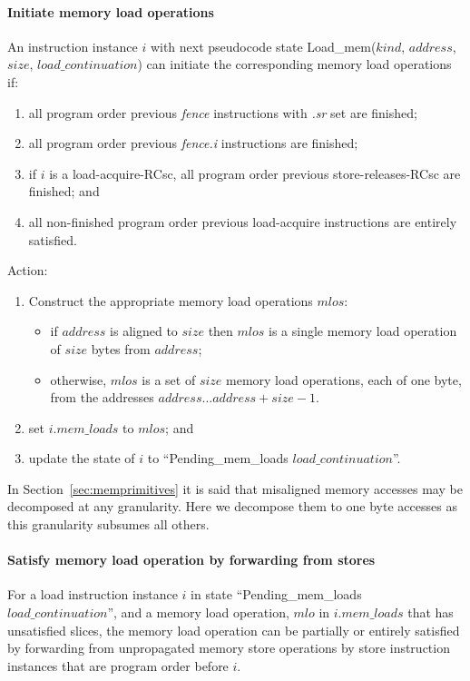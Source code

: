\paragraph{Initiate memory load operations}\label{omm:initiate_load}
An instruction instance $i$ with next pseudocode state {\sc Load\_mem}($kind$, $address$, $size$, $load\_continuation$) can initiate the corresponding memory load operations if:
\begin{enumerate}
\item all program order previous {\em fence} instructions with {\em .sr} set are finished;
\item all program order previous {\em fence.i} instructions are finished; 
\item if $i$ is a load-acquire-RCsc, all program order previous store-releases-RCsc are finished; and
\item all non-finished program order previous load-acquire instructions are entirely satisfied.
\end{enumerate}
Action:
\begin{enumerate}
\item Construct the appropriate memory load operations $mlos$:
  \begin{itemize}
  \item if $address$ is aligned to $size$ then $mlos$ is a single memory load operation of $size$ bytes from $address$;
  \item otherwise, $mlos$ is a set of $size$ memory load operations, each of one byte, from the addresses $address\ldots address+size-1$.
  \end{itemize}
\item set $i.mem\_loads$ to $mlos$; and
\item update the state of $i$ to ``{\sc Pending\_mem\_loads} $load\_continuation$''.
\end{enumerate}

\begin{commentary}
In Section~\ref{sec:memprimitives} it is said that misaligned memory accesses may be decomposed at any granularity.
Here we decompose them to one byte accesses as this granularity subsumes all others.
\end{commentary}

\paragraph{Satisfy memory load operation by forwarding from stores}\label{omm:sat_by_forwarding}
For a load instruction instance $i$ in state ``{\sc Pending\_mem\_loads} $load\_continuation$'', and a memory load operation, $mlo$ in $i.mem\_loads$ that has unsatisfied slices, the memory load operation can be partially or entirely satisfied by forwarding from unpropagated memory store operations by store instruction instances that are program order before $i$.


